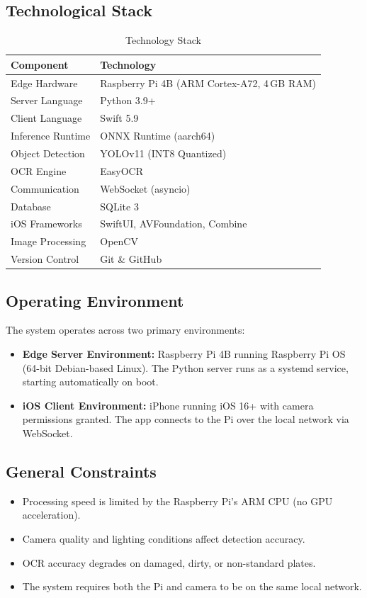 \subsection{Technological Stack}
\begin{table}[H]
\centering
\caption{Technology Stack}
\renewcommand{\arraystretch}{1.3}
\begin{tabular}{|l|l|}
\hline
\textbf{Component} & \textbf{Technology} \\
\hline
Edge Hardware & Raspberry Pi 4B (ARM Cortex-A72, 4\,GB RAM) \\
\hline
Server Language & Python 3.9+ \\
\hline
Client Language & Swift 5.9 \\
\hline
Inference Runtime & ONNX Runtime (aarch64) \\
\hline
Object Detection & YOLOv11 (INT8 Quantized) \\
\hline
OCR Engine & EasyOCR \\
\hline
Communication & WebSocket (asyncio) \\
\hline
Database & SQLite 3 \\
\hline
iOS Frameworks & SwiftUI, AVFoundation, Combine \\
\hline
Image Processing & OpenCV \\
\hline
Version Control & Git \& GitHub \\
\hline
\end{tabular}
\end{table}

\subsection{Operating Environment}
The system operates across two primary environments:
\begin{itemize}
    \item \textbf{Edge Server Environment:} Raspberry Pi 4B running Raspberry Pi OS (64-bit Debian-based Linux). The Python server runs as a systemd service, starting automatically on boot.
    \item \textbf{iOS Client Environment:} iPhone running iOS 16+ with camera permissions granted. The app connects to the Pi over the local network via WebSocket.
\end{itemize}

\subsection{General Constraints}
\begin{itemize}
    \item Processing speed is limited by the Raspberry Pi's ARM CPU (no GPU acceleration).
    \item Camera quality and lighting conditions affect detection accuracy.
    \item OCR accuracy degrades on damaged, dirty, or non-standard plates.
    \item The system requires both the Pi and camera to be on the same local network.
\end{itemize}

